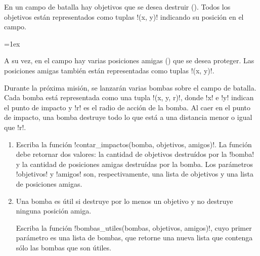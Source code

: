 En un campo de batalla
hay objetivos que se desea destruir (\frownie).
Todos los objetivos están representados
como tuplas \li!(x, y)!
indicando su posición en el campo.

\begin{minipage}{0.65\textwidth}
  \parskip=1ex

  A su vez,
  en el campo hay varias posiciones amigas (\smiley)
  que se desea proteger.
  Las posiciones amigas también están representadas
  como tuplas \li!(x, y)!.

  Durante la próxima misión,
  se lanzarán varias bombas sobre el campo de batalla.
  Cada bomba está representada
  como una tupla \li!(x, y, r)!,
  donde \li!x! e \li!y! indican el punto de impacto
  y \li!r! es el radio de acción de la bomba.
  Al caer en el punto de impacto,
  una bomba destruye todo lo que está
  a una distancia menor o igual que \li!r!.
\end{minipage}
\hfill
\begin{minipage}{.25\textwidth}
  \hfill
\end{minipage}

\begin{enumerate}[leftmargin=0pt,label=\emph{\alph*})]

  \item
    Escriba la función \li!contar_impactos(bomba, objetivos, amigos)!.
    La función debe retornar dos valores:
    la cantidad de objetivos destruídos por la \li!bomba!
    y la cantidad de posiciones amigas destruídas por la bomba.
    Los parámetros \li!objetivos! y \li!amigos! son, respectivamente,
    una lista de objetivos y una lista de posiciones amigas.

  \item
    Una bomba es útil si destruye por lo menos un objetivo
    y no destruye ninguna posición amiga.

    Escriba la función \li!bombas_utiles(bombas, objetivos, amigos)!,
    cuyo primer parámetro es una lista de bombas,
    que retorne una nueva lista que contenga sólo las bombas que son útiles.

\end{enumerate}

